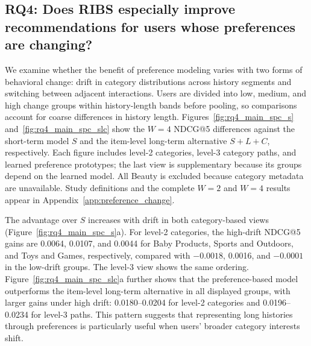 ﻿\documentclass[sigconf,anonymous,review]{acmart}
\begin{document}







\subsection{RQ4: Does RIBS especially improve recommendations for users whose preferences are changing?}
\label{sec:rq4_preference_change}

We examine whether the benefit of preference modeling varies with two forms of behavioral change: drift in category distributions across history segments and switching between adjacent interactions. Users are divided into low, medium, and high change groups within history-length bands before pooling, so comparisons account for coarse differences in history length. Figures~\ref{fig:rq4_main_spc_s} and~\ref{fig:rq4_main_spc_slc} show the $W=4$ NDCG@5 differences against the short-term model $S$ and the item-level long-term alternative $S+L+C$, respectively. Each figure includes level-2 categories, level-3 category paths, and learned preference prototypes; the last view is supplementary because its groups depend on the learned model. All Beauty is excluded because category metadata are unavailable. Study definitions and the complete $W=2$ and $W=4$ results appear in Appendix~\ref{app:preference_change}.

The advantage over $S$ increases with drift in both category-based views (Figure~\ref{fig:rq4_main_spc_s}a). For level-2 categories, the high-drift NDCG@5 gains are 0.0064, 0.0107, and 0.0044 for Baby Products, Sports and Outdoors, and Toys and Games, respectively, compared with $-0.0018$, 0.0016, and $-0.0001$ in the low-drift groups. The level-3 view shows the same ordering. Figure~\ref{fig:rq4_main_spc_slc}a further shows that the preference-based model outperforms the item-level long-term alternative in all displayed groups, with larger gains under high drift: 0.0180--0.0204 for level-2 categories and 0.0196--0.0234 for level-3 paths. This pattern suggests that representing long histories through preferences is particularly useful when users' broader category interests shift.
\end{document}
